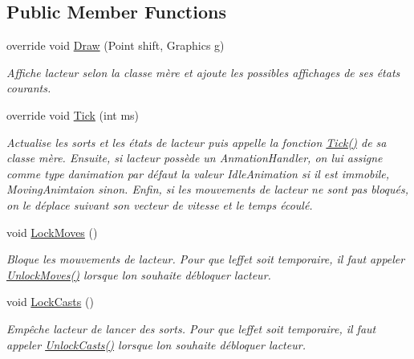 \subsection*{Public Member Functions}
\begin{DoxyCompactItemize}
\item 
override void \hyperlink{class_tentacle_slicers_1_1actors_1_1_controlled_actor_a8120affe933e4003bc0866f06589eeac}{Draw} (Point shift, Graphics g)
\begin{DoxyCompactList}\small\item\em Affiche l\textquotesingle{}acteur selon la classe mère et ajoute les possibles affichages de ses états courants. \end{DoxyCompactList}\item 
override void \hyperlink{class_tentacle_slicers_1_1actors_1_1_controlled_actor_aa66cbbda81610ee2610e540e59725a39}{Tick} (int ms)
\begin{DoxyCompactList}\small\item\em Actualise les sorts et les états de l\textquotesingle{}acteur puis appelle la fonction \hyperlink{class_tentacle_slicers_1_1actors_1_1_controlled_actor_aa66cbbda81610ee2610e540e59725a39}{Tick()} de sa classe mère. Ensuite, si l\textquotesingle{}acteur possède un Anmation\+Handler, on lui assigne comme type d\textquotesingle{}animation par défaut la valeur Idle\+Animation si il est immobile, Moving\+Animtaion sinon. Enfin, si les mouvements de l\textquotesingle{}acteur ne sont pas bloqués, on le déplace suivant son vecteur de vitesse et le temps écoulé. \end{DoxyCompactList}\item 
void \hyperlink{class_tentacle_slicers_1_1actors_1_1_controlled_actor_a2dece877131bcd6f29898b3b7c594524}{Lock\+Moves} ()
\begin{DoxyCompactList}\small\item\em Bloque les mouvements de l\textquotesingle{}acteur. Pour que l\textquotesingle{}effet soit temporaire, il faut appeler \hyperlink{class_tentacle_slicers_1_1actors_1_1_controlled_actor_a14547b4a4eff36c7d604d102b1ab30e3}{Unlock\+Moves()} lorsque l\textquotesingle{}on souhaite débloquer l\textquotesingle{}acteur. \end{DoxyCompactList}\item 
void \hyperlink{class_tentacle_slicers_1_1actors_1_1_controlled_actor_a61e01e8419547521e6ed595bb4ca6226}{Lock\+Casts} ()
\begin{DoxyCompactList}\small\item\em Empêche l\textquotesingle{}acteur de lancer des sorts. Pour que l\textquotesingle{}effet soit temporaire, il faut appeler \hyperlink{class_tentacle_slicers_1_1actors_1_1_controlled_actor_a046c8e6ce7e9d5a2cf7520939cba40a0}{Unlock\+Casts()} lorsque l\textquotesingle{}on souhaite débloquer l\textquotesingle{}acteur. \end{DoxyCompactList}\item 

\end{DoxyCompactItemize}
